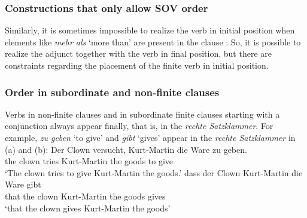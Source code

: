\subsubsection{Constructions that only allow SOV order}

Similarly, it is sometimes impossible to realize the verb in initial position when elements like
\emph{mehr als} `more than' are present in the clause \citep{Haider97c,Meinunger2001a}: 
\eal
{}
\zl
So, it is possible to realize the adjunct together with the verb in final position, but there are
constraints regarding the placement of the finite verb in initial position.


\subsubsection{Order in subordinate and non-finite clauses}

Verbs in non-finite clauses and in subordinate finite clauses starting with a conjunction
  always appear finally, that is, in the \emph{rechte Satzklammer}. For example, \emph{zu geben} `to
  give' and \emph{gibt} `gives' appear in the \emph{rechte Satzklammer} in (a) and (b):
\eal
\ex 
\gll Der Clown versucht, Kurt-Martin die Ware zu geben.\\
     the clown tries     Kurt-Martin the goods to give\\
\glt `The clown tries to give Kurt-Martin the goods.'
\ex 
\gll dass der Clown Kurt-Martin die Ware gibt\\
     that the clown Kurt-Martin the goods gives\\
\glt `that the clown gives Kurt-Martin the goods'
\zl



